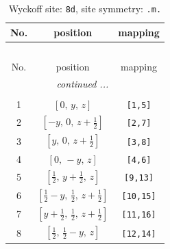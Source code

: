 \documentclass[fleqn,8pt]{jsarticle}
\begin{document}
\begin{longtable}{ccc}
\caption{Wyckoff site: {\tt 8d}, site symmetry: {\tt .m.}}
 \\
 \hline \hline
No. & position & mapping \\ \hline \endfirsthead

\multicolumn{2}{l}{\tablename\ \thetable{}} \\
 \hline \hline
No. & position & mapping \\ \hline \endhead

 \hline \hline
\multicolumn{2}{r}{\footnotesize\it continued ...} \\ \endfoot

 \hline \hline
\multicolumn{2}{r}{} \\ \endlastfoot

1 & $\left[ 0,\, y,\, z \right]$ & {\tt [1,5]} \\ \hline
2 & $\left[ - y,\, 0,\, z + \frac{1}{2} \right]$ & {\tt [2,7]} \\ \hline
3 & $\left[ y,\, 0,\, z + \frac{1}{2} \right]$ & {\tt [3,8]} \\ \hline
4 & $\left[ 0,\, - y,\, z \right]$ & {\tt [4,6]} \\ \hline
5 & $\left[ \frac{1}{2},\, y + \frac{1}{2},\, z \right]$ & {\tt [9,13]} \\ \hline
6 & $\left[ \frac{1}{2} - y,\, \frac{1}{2},\, z + \frac{1}{2} \right]$ & {\tt [10,15]} \\ \hline
7 & $\left[ y + \frac{1}{2},\, \frac{1}{2},\, z + \frac{1}{2} \right]$ & {\tt [11,16]} \\ \hline
8 & $\left[ \frac{1}{2},\, \frac{1}{2} - y,\, z \right]$ & {\tt [12,14]} \\
\end{longtable}
\renewcommand{\arraystretch}{1.2}
\end{document}
